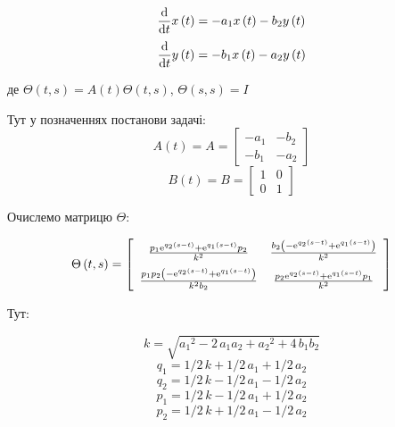 \documentclass[fontsize=14pt,DIV=1,a4paper]{scrartcl}
\begin{document}
\begin{equation}
{\frac {\rm d}{{\rm d}t}}x \left( t \right) =-a_{{1}}x
 \left( t \right) -b_{{2}}y \left( t \right)
\end{equation}
\begin{equation}
 {\frac {\rm d}{{\rm d}t}
}y \left( t \right) =-b_{{1}}x \left( t \right) -a_{{2}}y \left( t
 \right)
\end{equation}

де $\Theta(t, s) = A (t) \Theta (t, s)$, $\Theta (s, s) = I$

Тут у позначеннях постанови задачі:
\begin{equation}
A(t) = A = 
\begin{bmatrix}
    -a_{1} & -b_{2}\\
    -b_{1} & -a_{2}
\end{bmatrix}
\end{equation}
\begin{equation}
B(t) = B = 
\begin{bmatrix}
    1 & 0\\
    0 & 1
\end{bmatrix}
\end{equation}

Очислемо матрицю $\Theta$:

\begin{equation}
\Theta \left( t,s \right) = \left[ \begin {array}{cc} {\frac {p_{{1}}{
{\rm e}^{q_{{2}} \left( s-t \right) }}+{{\rm e}^{q_{{1}} \left( s-t
 \right) }}p_{{2}}}{{k}^{2}}}&{\frac {b_{{2}} \left( -{{\rm e}^{q_{{2}
} \left( s-t \right) }}+{{\rm e}^{q_{{1}} \left( s-t \right) }}
 \right) }{{k}^{2}}}\\ \noalign{\medskip}{\frac {p_{{1}}p_{{2}}
 \left( -{{\rm e}^{q_{{2}} \left( s-t \right) }}+{{\rm e}^{q_{{1}}
 \left( s-t \right) }} \right) }{{k}^{2}b_{{2}}}}&{\frac {p_{{2}}{
{\rm e}^{q_{{2}} \left( s-t \right) }}+{{\rm e}^{q_{{1}} \left( s-t
 \right) }}p_{{1}}}{{k}^{2}}}\end {array} \right]
\end{equation}

Тут:

\begin{equation}
{k}=\sqrt {{a_{{1}}}^{2}-2\,a_{{1}}a_{{2}}+{a_{{2}}}^{2}+4\,b_{{1}}b_{{2}}}
\end{equation}
\begin{equation}
q_{{1}}=1/2\,{k}+1/2\,a_{{1}}+1/2\,a_{{2}}
\end{equation}
\begin{equation}
q_{{2}}=1/2\,{k}-1/2\,a_{{1}}-1/2\,a_{{2}}
\end{equation}
\begin{equation}
p_{{1}}=1/2\,{k}-1/2\,a_{{1}}+1/2\,a_{{2}}
\end{equation}
\begin{equation}
p_{{2}}=1/2\,{k}+1/2\,a_{{1}}-1/2\,a_{{2}}
\end{equation}
\end{document}
